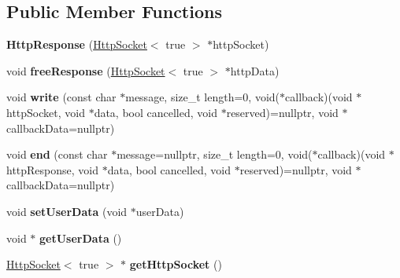 \subsection*{Public Member Functions}
\begin{DoxyCompactItemize}
\item 
\mbox{\label{structu_w_s_1_1_http_response_a54fd997d585c3375f8685c4cee6a9201}} 
{\bfseries Http\+Response} (\mbox{\hyperlink{structu_w_s_1_1_http_socket}{Http\+Socket}}$<$ true $>$ $\ast$http\+Socket)
\item 
\mbox{\label{structu_w_s_1_1_http_response_abced9674518797380531fe48e43c6b3e}} 
void {\bfseries free\+Response} (\mbox{\hyperlink{structu_w_s_1_1_http_socket}{Http\+Socket}}$<$ true $>$ $\ast$http\+Data)
\item 
\mbox{\label{structu_w_s_1_1_http_response_a779902867cf190accb33620647ac173b}} 
void {\bfseries write} (const char $\ast$message, size\+\_\+t length=0, void($\ast$callback)(void $\ast$http\+Socket, void $\ast$data, bool cancelled, void $\ast$reserved)=nullptr, void $\ast$callback\+Data=nullptr)
\item 
\mbox{\label{structu_w_s_1_1_http_response_a434d39052975ed297c873f8bb5917620}} 
void {\bfseries end} (const char $\ast$message=nullptr, size\+\_\+t length=0, void($\ast$callback)(void $\ast$http\+Response, void $\ast$data, bool cancelled, void $\ast$reserved)=nullptr, void $\ast$callback\+Data=nullptr)
\item 
\mbox{\label{structu_w_s_1_1_http_response_ae63909578b423ce1ead51da1803ad314}} 
void {\bfseries set\+User\+Data} (void $\ast$user\+Data)
\item 
\mbox{\label{structu_w_s_1_1_http_response_aeced16ea15e520b212ee3ac3674d83d0}} 
void $\ast$ {\bfseries get\+User\+Data} ()
\item 
\mbox{\label{structu_w_s_1_1_http_response_a812283f288883e9f6e18f9e33c05e98e}} 
\mbox{\hyperlink{structu_w_s_1_1_http_socket}{Http\+Socket}}$<$ true $>$ $\ast$ {\bfseries get\+Http\+Socket} ()
\end{DoxyCompactItemize}
